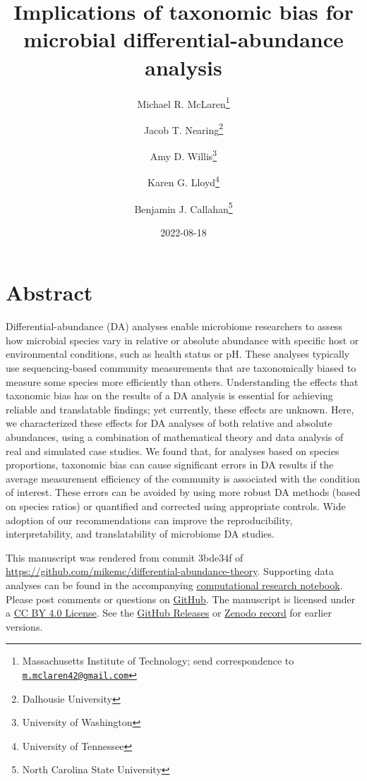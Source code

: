 \documentclass[
]{article}
\title{Implications of taxonomic bias for microbial differential-abundance analysis}
\author{Michael R. McLaren\footnote{Massachusetts Institute of Technology; send correspondence to \href{mailto:m.mclaren42@gmail.com}{\nolinkurl{m.mclaren42@gmail.com}}} \and Jacob T. Nearing\footnote{Dalhousie University} \and Amy D. Willis\footnote{University of Washington} \and Karen G. Lloyd\footnote{University of Tennessee} \and Benjamin J. Callahan\footnote{North Carolina State University}}
\date{2022-08-18}
\begin{document}
\maketitle

{
\setcounter{tocdepth}{2}
\tableofcontents
}
\hypertarget{abstract}{%
\section*{Abstract}\label{abstract}}

Differential-abundance (DA) analyses enable microbiome researchers to assess how microbial species vary in relative or absolute abundance with specific host or environmental conditions, such as health status or pH.
These analyses typically use sequencing-based community measurements that are taxonomically biased to measure some species more efficiently than others.
Understanding the effects that taxonomic bias has on the results of a DA analysis is essential for achieving reliable and translatable findings; yet currently, these effects are unknown.
Here, we characterized these effects for DA analyses of both relative and absolute abundances, using a combination of mathematical theory and data analysis of real and simulated case studies.
We found that, for analyses based on species proportions, taxonomic bias can cause significant errors in DA results if the average measurement efficiency of the community is associated with the condition of interest.
These errors can be avoided by using more robust DA methods (based on species ratios) or quantified and corrected using appropriate controls.
Wide adoption of our recommendations can improve the reproducibility, interpretability, and translatability of microbiome DA studies.

\leavevmode{}%
This manuscript was rendered from commit 3bde34f of \url{https://github.com/mikemc/differential-abundance-theory}.
Supporting data analyses can be found in the accompanying \href{https://mikemc.github.io/differential-abundance-theory/notebook/}{computational research notebook}.
Please post comments or questions on \href{https://github.com/mikemc/differential-abundance-theory}{GitHub}.
The manuscript is licensed under a \href{https://creativecommons.org/licenses/by/4.0/}{CC BY 4.0 License}.
See the \href{https://github.com/mikemc/differential-abundance-theory/releases}{GitHub Releases} or \href{https://doi.org/10.5281/zenodo.4552717}{Zenodo record} for earlier versions.
\end{document}
